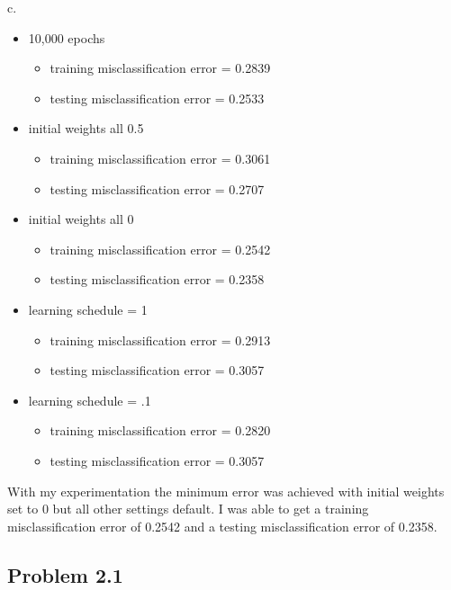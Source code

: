 \documentclass[a4paper]{article}
\begin{document}
\noindent
c.
\begin{itemize}
    \item 10,000 epochs
    \begin{itemize}
        \item training misclassification error = 0.2839
        \item testing misclassification error = 0.2533
    \end{itemize}
    \item initial weights all 0.5
    \begin{itemize}
        \item training misclassification error = 0.3061
        \item testing misclassification error = 0.2707
    \end{itemize}
    \item initial weights all 0
    \begin{itemize}
        \item training misclassification error = 0.2542
        \item testing misclassification error = 0.2358
    \end{itemize}
    \item learning schedule = 1
    \begin{itemize}
        \item training misclassification error = 0.2913
        \item testing misclassification error = 0.3057
    \end{itemize}
    \item learning schedule = .1
    \begin{itemize}
        \item training misclassification error = 0.2820
        \item testing misclassification error = 0.3057
    \end{itemize}
\end{itemize}

\noindent
With my experimentation the minimum error was achieved with initial weights set to 0 but all other settings default. I was able to get a training misclassification error of 0.2542 and a testing misclassification error of 0.2358.


\subsection{Problem 2.1}
\end{document}

